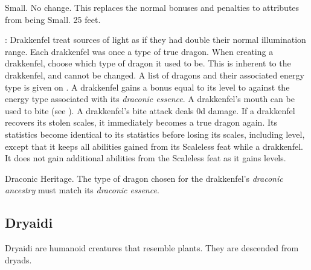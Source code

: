          Small.
         No change. This replaces the normal bonuses and penalties to attributes from being Small.
         25 feet.
        \begin{itemize}
            : Drakkenfel treat sources of light as if they had double their normal illumination range.
             Each drakkenfel was once a type of true dragon.
                When creating a drakkenfel, choose which type of dragon it used to be.
                This is inherent to the drakkenfel, and cannot be changed.
                A list of dragons and their associated energy type is given on .
             A drakkenfel gains a bonus equal to its level to  against the energy type associated with its \textit{draconic essence}.
             A drakkenfel's mouth can be used to bite (see ). A drakkenfel's bite attack deals \plus0d damage.
             If a drakkenfel recovers its stolen scales, it immediately becomes a true dragon again.
                Its statistics become identical to its statistics before losing its scales, including level, except that it keeps all abilities gained from its Scaleless feat while a drakkenfel.
                It does not gain additional abilities from the Scaleless feat as it gains levels.
        \end{itemize}
         Draconic Heritage. The type of dragon chosen for the drakkenfel's \textit{draconic ancestry} must match its \textit{draconic essence}.

    \subsection{Dryaidi}

        Dryaidi are humanoid creatures that resemble plants. They are descended from dryads.

